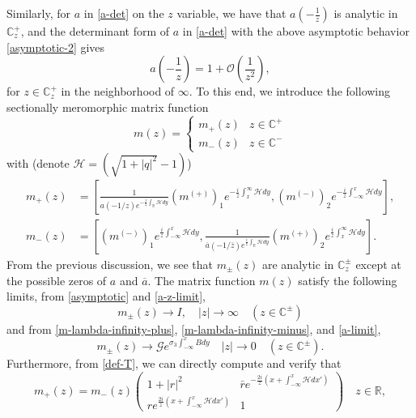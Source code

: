 \documentclass[11pt]{article}
\newcommand{\RR}{{\mathbb R}}
\newcommand{\CC}{{\mathbb C}}
\newcommand{\HH}{\mathcal{H}}
\begin{document}
Similarly, for $a$ in \eqref{a-det} on the $z$ variable, we have that $a(-\frac{1}{z})$ is analytic in $\CC_z^+$, and the determinant form of $a$ in \eqref{a-det} with the above asymptotic behavior \eqref{asymptotic-2} gives
\begin{equation}\label{a-z-limit}
a(-\frac{1}{z})=1+\mathcal{O}(\frac{1}{z^2}),
\end{equation}
for $z\in \CC^+_z$ in the neighborhood of $\infty$. 
To this end, we introduce the following sectionally meromorphic matrix function
\begin{equation} \label{normalized-m}
m(z)=\left\{\begin{matrix} m_+(z) & z \in \CC^+ \\
 m_-(z) & z \in \CC^- 
 \end{matrix} \right.
 \end{equation}
with (denote $\HH=(\sqrt{1+|q|^2}-1)$)
 \begin{align*}
 m_+(z)&= \left[ \frac{1}{a(-1/z)e^{-\frac{i}{z}\int_{\RR}\mathcal{H}dy}} (m^{(+)})_1e^{-\frac{i}{z}\int_{x}^{\infty}\mathcal{H}dy}, (m^{(-)})_2e^{-\frac{i}{z}\int_{-\infty}^x\mathcal{H}dy}\right],\\ m_-(z)&= \left[(m^{(-)})_1e^{\frac{i}{z}\int_{-\infty}^x\mathcal{H}dy},  \frac{1}{\overline{a}(-1/\bar{z})e^{\frac{i}{z}\int_{\RR}\mathcal{H}dy}} (m^{(+)})_2e^{\frac{i}{z}\int_{x}^{\infty}\mathcal{H}dy}\right].
 \end{align*}
 From the previous discussion, we see that $m_{\pm}(z)$ are analytic in $\CC^{\pm}_z$ except at the possible zeros of $a$ and $\overline{a}$. The matrix function $m(z)$ satisfy the following limits, from \eqref{asymptotic} and \eqref{a-z-limit}, 
 \begin{equation}\label{m-limit-1}
m_{\pm}(z)\rightarrow I, \quad |z|\rightarrow \infty \quad (z \in \CC^{\pm})
\end{equation}
and from \eqref{m-lambda-infinity-plus}, \eqref{m-lambda-infinity-minus}, and \eqref{a-limit},
\begin{equation}\label{m-limit-2}
m_{\pm}(z) \rightarrow \mathcal{G}e^{\sigma_3\int_{-\infty}^xBdy} \quad |z|\rightarrow 0 \quad (z \in \CC^{\pm}).
 \end{equation}
Furthermore, from \eqref{def-T}, we can directly compute and verify that 
 \begin{equation} \label{jump-RHP}
m_+(z)= m_-(z) \begin{pmatrix} 1+|r|^2 & \bar{r}e^{-\frac{2i}{z}(x+\int_{-\infty}^x\mathcal{H}dx')} \\
r e^{\frac{2i}{z}(x+\int_{-\infty}^x\mathcal{H}dx')} & 1 \end{pmatrix} \quad z\in \RR,
\end{equation}
\end{document}
